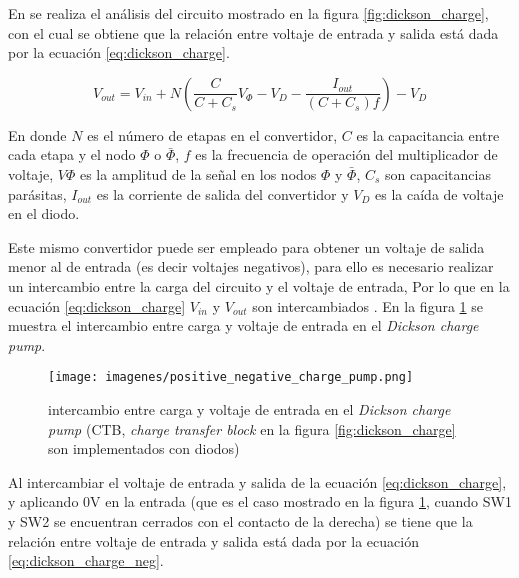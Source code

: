     En \cite{charge_dikson} se realiza el análisis del circuito mostrado
    en la figura \ref{fig:dickson_charge}, con
    el cual se obtiene que la relación entre voltaje de entrada y salida está dada
    por la ecuación \ref{eq:dickson_charge}.

    \begin{equation}
        V_{out} = V_{in} + N \left (  \frac{C}{C+C_s}V_\Phi - V_D - 
        \frac{I_{out}}{(C+C_s)f} \right ) - V_D
        \label{eq:dickson_charge}
    \end{equation}

    En donde $N$ es el número de etapas en el convertidor, $C$ es la capacitancia
    entre cada etapa y el nodo $\Phi$ o $\bar{\Phi}$, $f$ es la frecuencia de 
    operación del multiplicador de voltaje, $V{\Phi}$ es la amplitud
    de la señal en los nodos $\Phi$ y $\bar{\Phi}$, $C_s$ son capacitancias parásitas,
    $I_{out}$ es la corriente de salida del
    convertidor y $V_D$ es la caída de voltaje en el diodo.

    Este mismo convertidor puede ser empleado para obtener un voltaje de salida
    menor al de entrada (es decir voltajes negativos), para ello es necesario
    realizar un intercambio entre la carga del circuito y el voltaje de entrada,
    Por lo que en la ecuación \ref{eq:dickson_charge} $V_{in}$ y $V_{out}$
    son intercambiados \cite{mohammad_switched_2010}. En la figura 
    \ref{fig:dickson_charge_bid} se muestra el intercambio entre carga y 
    voltaje de entrada en el \textit{Dickson charge pump}.
    
    \begin{figure}[H]
        \centering
        \texttt{[image: imagenes/positive\_negative\_charge\_pump.png]}
        \caption{intercambio entre carga y voltaje de entrada en el
                 \textit{Dickson charge pump} (CTB, \textit{charge transfer
                 block} en la figura \ref{fig:dickson_charge} son implementados
                 con diodos) \cite{mohammad_switched_2010}}
        \label{fig:dickson_charge_bid}
    \end{figure}

    Al intercambiar el voltaje de entrada y salida de la ecuación \ref{eq:dickson_charge},
    y aplicando $0$V en la entrada (que es el caso mostrado en la figura 
    \ref{fig:dickson_charge_bid}, cuando SW1 y SW2 se encuentran cerrados 
    con el contacto de la derecha) se tiene que la relación entre voltaje de entrada
    y salida está dada por la ecuación \ref{eq:dickson_charge_neg}.

